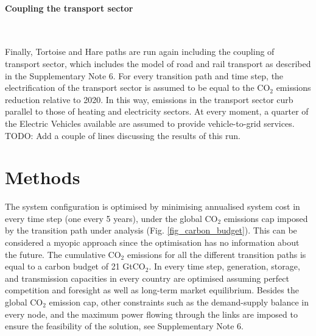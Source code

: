 \documentclass[5p]{elsarticle} %
\begin{document}
\paragraph{\textbf{Coupling the transport sector}} \

Finally, Tortoise and Hare paths are run again including the coupling of transport sector, which includes the model of road and rail transport as described in the Supplementary Note 6.  For every transition path and time step, the electrification of the transport sector is assumed to be equal to the CO$_2$ emissions reduction relative to 2020. In this way, emissions in the transport sector curb parallel to those of heating and electricity sectors. At every moment, a quarter of the Electric Vehicles available are assumed to provide vehicle-to-grid services. \textcolor[rgb]{1,0,0}{TODO: Add a couple of lines discussing the results of this run. }



\section{Methods}

The system configuration is optimised by minimising annualised system cost in every time step (one every 5 years), under the global CO$_2$ emissions cap imposed by the transition path under analysis (Fig. \ref{fig_carbon_budget}). This can be considered a myopic approach since the optimisation has no information about the future. The cumulative CO$_2$ emissions for all the different transition paths is equal to a carbon budget of 21 GtCO$_2$. In every time step, generation, storage, and transmission capacities in every country are optimised assuming perfect competition and foresight as well as long-term market equilibrium. Besides the global CO$_2$ emission cap, other constraints such as the demand-supply balance in every node, and the maximum power flowing through the links are imposed to ensure the feasibility of the solution, see Supplementary Note 6. \
\end{document}
